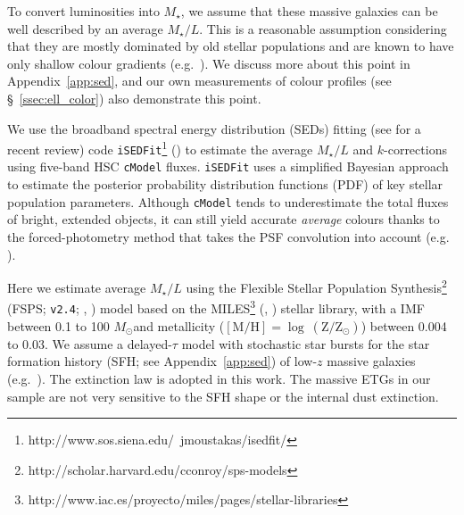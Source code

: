 \documentclass[fleqn,usenatbib]{mnras}
\def\msun{$M_\odot$}
\def\cmodel{\texttt{cModel}}
\def\mstar{{$M_{\star}$}}
\def\m2l{{$M_{\star}/L$}}
\begin{document}
    To convert luminosities into \mstar{}, we assume that these massive galaxies 
    can be well described by an average \m2l{}. 
    This is a reasonable assumption considering that they are mostly dominated by 
    old stellar populations and are known to have only shallow colour gradients
    (e.g.\ \citealt{Carollo1993, Davies1993, LaBarbera2012, DSouza2014}). 
    We discuss more about this point in Appendix~\ref{app:sed}, and our own 
    measurements of colour profiles (see \S~\ref{ssec:ell_color}) also demonstrate 
    this point. 

    We use the broadband spectral energy distribution (SEDs) fitting 
    (see \citealt{Walcher2011} for a recent review) code 
    \texttt{iSEDFit}\footnote{http://www.sos.siena.edu/~jmoustakas/isedfit/} 
    (\citealt{Moustakas13}) to estimate the average \m2l{} and $k$-corrections using
    five-band HSC \cmodel{} fluxes.
    \texttt{iSEDFit} uses a simplified Bayesian approach to estimate the 
    posterior probability distribution functions (PDF) of key stellar population
    parameters.
    Although \cmodel{} tends to underestimate the total fluxes of bright, extended 
    objects, it can still yield accurate \emph{average} colours thanks to the 
    forced-photometry method that takes the PSF convolution into account
    (e.g. \citealt{SynPipe}). 
    
    Here we estimate average \m2l{} using the Flexible Stellar Population 
    Synthesis\footnote{http://scholar.harvard.edu/cconroy/sps-models}
    (FSPS; \texttt{v2.4}; \citealt{FSPS}, \citealt{Conroy2010}) model based on the 
    MILES\footnote{http://www.iac.es/proyecto/miles/pages/stellar-libraries}
    (\citealt{MILES1}, \citealt{MILES2}) stellar library, with a
    \citet{Chabrier2003} IMF between 0.1 to 100 \msun and metallicity 
    ($[\mathrm{M}/\mathrm{H}]=\log\ (\mathrm{Z}/\mathrm{Z}_{\odot})$) between 
    0.004 to 0.03. 
    We assume a delayed-$\tau$ model with stochastic star bursts 
    for the star formation history (SFH; see Appendix~\ref{app:sed}) of low-$z$ 
    massive galaxies (e.g.\ \citealt{Kauffmann2003}). 
    The \citet{Calzetti2000} extinction law is adopted in this work.
    The massive ETGs in our sample are not very sensitive to the SFH shape or the 
    internal dust extinction. 
    
\end{document}
